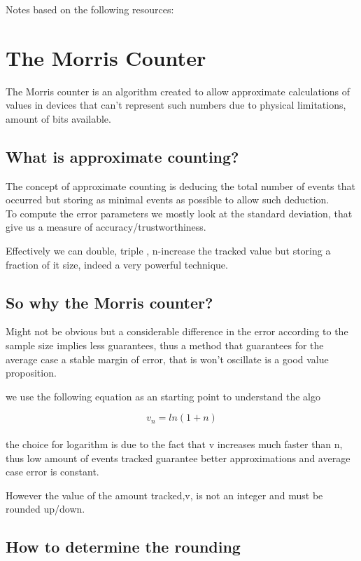 Notes based on the following resources:
\\
\cite{blogMorris}

\section{The Morris Counter}

The Morris counter is an algorithm created to allow approximate calculations of values in devices that can't represent
such numbers due to physical limitations, amount of bits available.

\subsection{What is approximate counting?}

The concept of approximate counting is deducing the total number of events that occurred but storing as minimal events as possible
to allow such deduction.
\\
To compute the error parameters we mostly look at the standard deviation, that give us a measure of accuracy/trustworthiness.

Effectively we can double, triple , n-increase the tracked value but storing a fraction of it size, indeed a very powerful technique.

\subsection{So why the Morris counter?}

Might not be obvious but a considerable difference in the error according to the sample size implies less guarantees, thus a method
that guarantees for the average case a stable margin of error, that is won't oscillate is a good value proposition.

we use the following equation as an starting point to understand the algo

\begin{equation}
	v_n = ln(1+n)
\end{equation}
\\
the choice for logarithm is due to the fact that v increases much faster than n, thus low amount of events  tracked guarantee better approximations
and average case error is constant.

However the value of the amount tracked,v, is not an integer and must be rounded up/down.

\subsection{How to determine the rounding}

